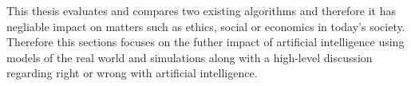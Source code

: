 
This thesis evaluates and compares two existing algorithms and therefore it has
negliable impact on matters such as ethics, social or economics in today's
society. Therefore this sections focuses on the futher impact of artificial
intelligence using models of the real world and simulations along with a
high-level discussion regarding right or wrong with artificial intelligence.
